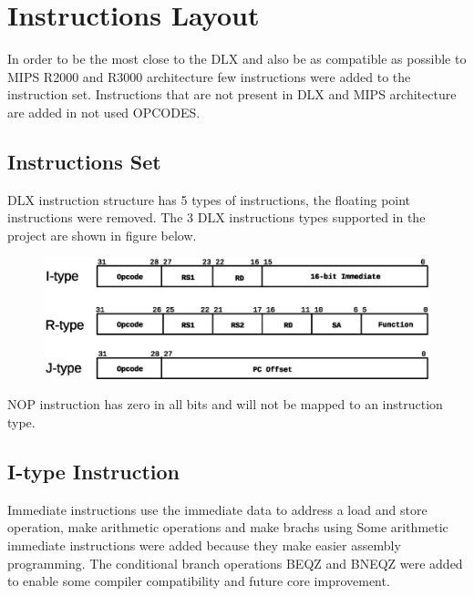 \documentclass{article}
\begin{document}
  \newpage
  \section{Instructions Layout}
  In order to be the most close to the DLX and also be as compatible as possible to MIPS R2000 and R3000 architecture few instructions were added to the instruction set. Instructions that are not present in DLX and MIPS architecture are added in not used OPCODES.
  \label{sec:instruction_layout}

  \subsection{Instructions Set}
  DLX instruction structure has 5 types of instructions, the floating point instructions were removed. The 3 DLX instructions types supported in the project are shown in figure below.
  
  \begin{figure}[H]
    \centering
    \includegraphics[width=\linewidth]{pictures/instruction_set.eps}
  \end{figure} 
  
NOP instruction has zero in all bits and will not be mapped to an instruction type.
  
  \subsection{I-type Instruction}
  Immediate instructions use the immediate data to address a load and store operation, make arithmetic operations and make brachs using 
Some arithmetic immediate instructions were added because they make easier assembly programming. The conditional branch operations BEQZ and BNEQZ were added to enable some compiler compatibility and future core improvement.
\end{document}
